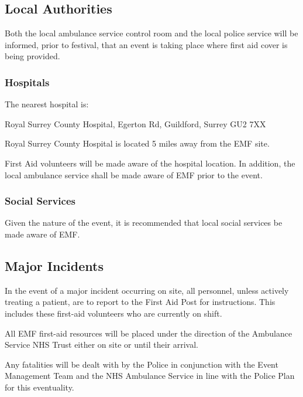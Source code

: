 \subsection{Local Authorities}
Both the local ambulance service control room and the local police service will
be informed, prior to festival, that an event is taking place where first aid
cover is being provided.

\subsubsection{Hospitals}

The nearest hospital is:

Royal Surrey County Hospital, Egerton Rd, Guildford, Surrey GU2 7XX

Royal Surrey County Hospital is located 5 miles away from the EMF site.

First Aid volunteers will be made aware of the hospital location. In addition,
the local ambulance service shall be made aware of EMF prior to the event.

\subsubsection{Social Services}

Given the nature of the event, it is recommended that local social services be made aware of EMF.

\subsection{Major Incidents}

In the event of a major incident occurring on site, all personnel, unless
actively treating a patient, are to report to the First Aid Post for
instructions. This includes these first-aid volunteers who are currently on
shift.

All EMF first-aid resources will be placed under the direction of the Ambulance
Service NHS Trust either on site or until their arrival.

Any fatalities will be dealt with by the Police in conjunction with the Event
Management Team and the NHS Ambulance Service in line with the Police Plan for
this eventuality.
